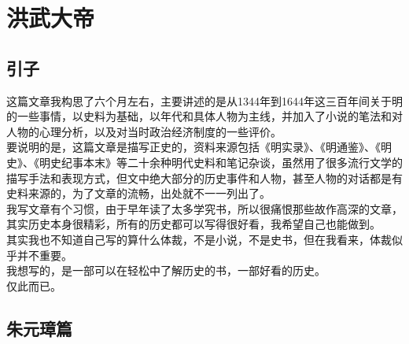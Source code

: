 \fancyhead[RO]{{\tiny{\textcolor{Gray}{\FA \ }}}\thepage}
\fancyhead[LE]{{\tiny{\textcolor{Gray}{\FA \ }}}\thepage}
\fancyfoot[LE,RO]{}
\fancyfoot[LO,CE]{}
\fancyfoot[CO,RE]{}
\setcounter{part}{0}
\setcounter{chapter}{1}
\setcounter{section}{0}
\part{洪武大帝}
\chapter*{引子}
\ifnum{}
	\begin{multicols}{\theparacolNo}
\fi
这篇文章我构思了六个月左右，主要讲述的是从1344年到1644年这三百年间关于明的一些事情，以史料为基础，以年代和具体人物为主线，并加入了小说的笔法和对人物的心理分析，以及对当时政治经济制度的一些评价。\\

要说明的是，这篇文章是描写正史的，资料来源包括《明实录》、《明通鉴》、《明史》、《明史纪事本末》等二十余种明代史料和笔记杂谈，虽然用了很多流行文学的描写手法和表现方式，但文中绝大部分的历史事件和人物，甚至人物的对话都是有史料来源的，为了文章的流畅，出处就不一一列出了。\\

我写文章有个习惯，由于早年读了太多学究书，所以很痛恨那些故作高深的文章，其实历史本身很精彩，所有的历史都可以写得很好看，我希望自己也能做到。\\

其实我也不知道自己写的算什么体裁，不是小说，不是史书，但在我看来，体裁似乎并不重要。\\

我想写的，是一部可以在轻松中了解历史的书，一部好看的历史。\\

仅此而已。\\
\ifnum{}
	\end{multicols}
\fi
\newpage
\chapter*{朱元璋篇}
